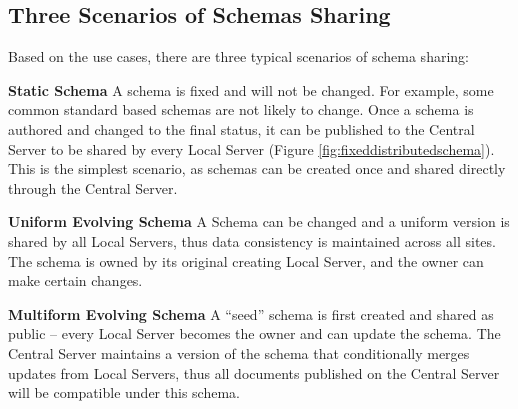 \documentclass{singlecol-new}
\theoremstyle{TH}{
\newtheorem{lemma}{Lemma}
\newtheorem{theorem}[lemma]{Theorem}
\newtheorem{corrolary}[lemma]{Corrolary}
\newtheorem{conjecture}[lemma]{Conjecture}
\newtheorem{proposition}[lemma]{Proposition}
\newtheorem{claim}[lemma]{Claim}
\newtheorem{stheorem}[lemma]{Wrong Theorem}
\newtheorem{algorithm}{Algorithm}
}
\theoremstyle{THrm}{
\newtheorem{definition}{Definition}[section]
\newtheorem{question}{Question}[section]
\newtheorem{remark}{Remark}
\newtheorem{scheme}{Scheme}
}
\theoremstyle{THhit}{
\newtheorem{case}{Case}[section]
}
\begin{document}
\begin{figure*}[t]%
\caption{An Example of Publishing Schemas from a Local Server}
\label{fig:schemapublish}
\end{figure*}

\begin{figure*}[t]%
\caption{An Example of Importing Schemas to a Local Server}
\label{fig:schemaimport}
\end{figure*}

\subsection{Three Scenarios of Schemas Sharing}

Based on the use cases, there are three typical scenarios of schema sharing:

\textbf{Static Schema} A schema is fixed and will not be changed.
For example, some common standard based schemas are not likely to
change. Once a schema is authored and changed to the final status,
it can be published to the Central Server to be shared by every
Local Server (Figure \ref{fig:fixeddistributedschema}). This is the
simplest scenario, as schemas can be created once and shared
directly through the Central Server.

\textbf{Uniform Evolving Schema} A Schema can be changed and a uniform
version is shared by all Local Servers, thus data consistency is maintained
across all sites.  The schema is owned by its original creating Local Server,
and the owner can make certain changes.


\textbf{Multiform Evolving Schema} A ``seed'' schema is first
created and shared as public -- every Local Server becomes the owner
and can update the schema. The Central Server maintains a version of
the schema that conditionally merges updates from Local Servers,
thus all documents published on the Central Server will be
compatible under this schema.

\begin{figure*}[t]%
\caption{Static Schemas Sharing} \label{fig:fixeddistributedschema}
\end{figure*}

\begin{figure*}[t]%
\caption{Uniform Schema Sharing} \label{fig:distributedschema}
\end{figure*}
\end{document}
